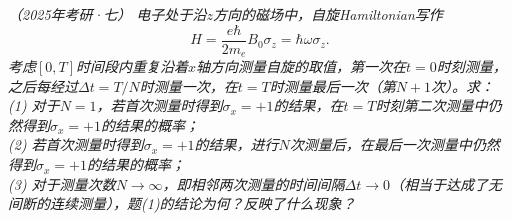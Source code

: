 \begin{tcolorbox}[breakable, title={\textbf{趣题：量子Zeno效应}}]
    \it\small
     （2025年考研·七）
    电子处于沿$z$方向的磁场中，自旋Hamiltonian写作
    \begin{equation}
        H = \frac{e\hbar}{2m_e} B_0 σ_z = \hbar ω σ_z.
    \end{equation}
    考虑$[0,T]$时间段内重复沿着$x$轴方向测量自旋的取值，第一次在$t=0$时刻测量，之后每经过$Δt=T/N$时测量一次，在$t=T$时测量最后一次（第$N+1$次）。求：\\
    (1) 对于$N=1$，若首次测量时得到$σ_x=+1$的结果，在$t=T$时刻第二次测量中仍然得到$σ_x=+1$的结果的概率；\\
    (2) 若首次测量时得到$σ_x=+1$的结果，进行$N$次测量后，在最后一次测量中仍然得到$σ_x=+1$的结果的概率；\\
    (3) 对于测量次数$N→∞$，即相邻两次测量的时间间隔$Δt→0$（相当于达成了无间断的连续测量），题(1)的结论为何？反映了什么现象？
    \vspace{1em}



\end{tcolorbox}
